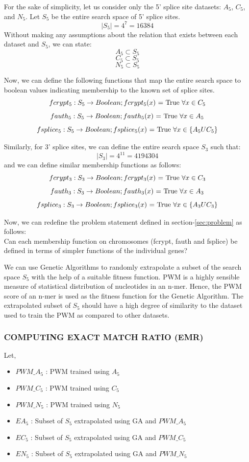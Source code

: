 \documentclass[12pt,a4paper]{article}
\begin{document}
	For the sake of simplicity, let us consider only the 5' splice site datasets: $A_5$, $C_5$, and $N_5$.
	Let $S_5$ be the entire search space of 5' splice sites.
	$$|S_5| = 4^7 = 16384$$
	Without making any assumptions about the relation that exists between each dataset and $S_5$, we can state: 
	$$ A_5 \subset S_5 $$ 
	$$ C_5 \subset S_5 $$
	$$ N_5 \subset S_5 $$

	Now, we can define the following functions that map the entire search space to boolean values indicating membership to the known set of splice sites.
	$$ fcrypt_5:  S_5 \rightarrow Boolean; fcrypt_5(x)\textnormal{ = True  }\forall x \in C_5 $$
	$$ fauth_5: S_5 \rightarrow Boolean; fauth_5(x)\textnormal{ = True  }\forall x \in A_5 $$
	$$ fsplice_5: S_5 \rightarrow Boolean; fsplice_5(x)\textnormal{ = True  }\forall x \in \{A_5 U C_5\} $$
	
	Similarly, for 3’ splice sites, we can define the entire search space $S_3$ such that:
	$$ |S_3| = 4^{11} = 4194304 $$
	and we can define similar membership functions as follows:
	$$ fcrypt_3:  S_3 \rightarrow Boolean; fcrypt_3(x)\textnormal{ = True  }\forall x \in C_3 $$
	$$ fauth_3: S_3 \rightarrow Boolean; fauth_3(x)\textnormal{ = True  }\forall x \in A_3 $$
	$$ fsplice_3: S_3 \rightarrow Boolean; fsplice_3(x)\textnormal{ = True  }\forall x \in \{A_3 U C_3\} $$
	
	Now, we can redefine the problem statement defined in section-\ref{sec:problem} as follows:\\
	Can each membership function on chromosomes (fcrypt, fauth and fsplice) be defined in terms of simpler functions of the individual genes? \par
	
	We can use Genetic Algorithms to randomly extrapolate a subset of the search space $S_5$ with the help of a suitable fitness function. PWM is a highly sensible measure of statistical distribution of nucleotides in an n-mer. Hence, the PWM score of an n-mer is used as the fitness function for the Genetic Algorithm. The extrapolated subset of $S_5$ should have a high degree of similarity to the dataset used to train the PWM as compared to other datasets. \par
	
	\subsubsection{COMPUTING EXACT MATCH RATIO (EMR)}
	Let,
	\begin{itemize}
		\item $PWM\_A_5$ : PWM trained using $A_5$
		\item $PWM\_C_5$ : PWM trained using $C_5$
		\item $PWM\_N_5$ : PWM trained using $N_5$
		\item $EA_5$ : Subset of $S_5$ extrapolated using GA and $PWM\_A_5$
		\item $EC_5$ : Subset of $S_5$ extrapolated using GA and $PWM\_C_5$
		\item $EN_5$ : Subset of $S_5$ extrapolated using GA and $PWM\_N_5$
	\end{itemize}
	
\end{document}
